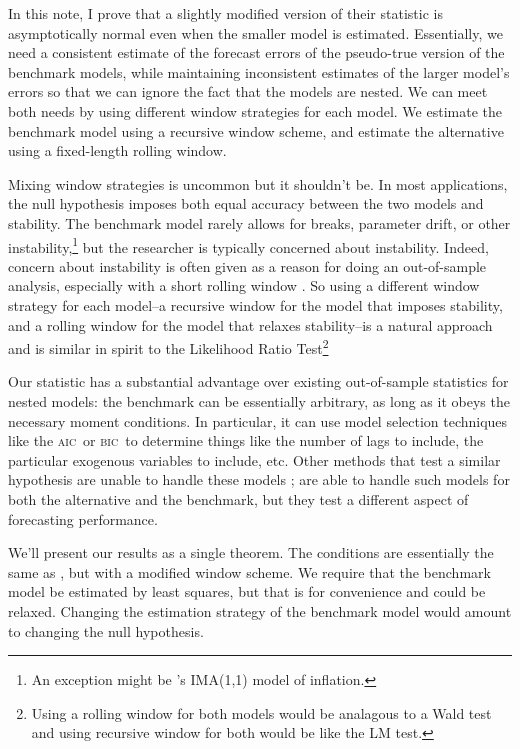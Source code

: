 \documentclass[12pt]{article}
\newcommand\possessivecite[1]{\citeauthor{#1}'s \citeyearpar{#1}}
\newcommand{\aic}{\textsc{aic}}
\newcommand{\bic}{\textsc{bic}}
\begin{document}
In this note, I prove that a slightly modified version of their
statistic is asymptotically normal even when the smaller model is
estimated.  Essentially, we need a consistent estimate of the forecast
errors of the pseudo-true version of the benchmark models, while
maintaining inconsistent estimates of the larger model's errors so
that we can ignore the fact that the models are nested.  We can meet
both needs by using different window strategies for each model.  We
estimate the benchmark model using a recursive window scheme, and
estimate the alternative using a fixed-length rolling window.

Mixing window strategies is uncommon but it shouldn't be. In most
applications, the null hypothesis imposes both equal accuracy between
the two models and stability.  The benchmark model rarely allows for
breaks, parameter drift, or other instability,\footnote{An exception
  might be \possessivecite{StW:08} IMA(1,1) model of inflation.} but
the researcher is typically concerned about instability.  Indeed,
concern about instability is often given as a reason for doing an
out-of-sample analysis, especially with a short rolling window
\citep{GiW:06,GiR:09,GiR:10}.  So using a different window strategy
for each model--a recursive window for the model that imposes
stability, and a rolling window for the model that relaxes
stability--is a natural approach and is similar in spirit to the
Likelihood Ratio Test\footnote{Using a rolling window for both models
  would be analagous to a Wald test and using recursive window for
  both would be like the LM test.}

Our statistic has a substantial advantage over existing out-of-sample
statistics for nested models: the benchmark can be essentially
arbitrary, as long as it obeys the necessary moment conditions.  In
particular, it can use model selection techniques like the \aic\ or
\bic\ to determine things like the number of lags to include, the
particular exogenous variables to include, etc.  Other methods that
test a similar hypothesis are unable to handle these models
\citep[except][which does not allow the benchmark to be
estimated]{ClW:06}; \citet{GiW:06} are able to handle such models for
both the alternative and the benchmark, but they test a different
aspect of forecasting performance.

We'll present our results as a single theorem.  The conditions are
essentially the same as
\citet{ClW:07,ClW:06,Wes:96,WeM:98,Mcc:00,GiW:06}, but with a modified
window scheme.  We require that the benchmark model be estimated by
least squares, but that is for convenience and could be relaxed.
Changing the estimation strategy of the benchmark model would amount
to changing the null hypothesis.
\end{document}
